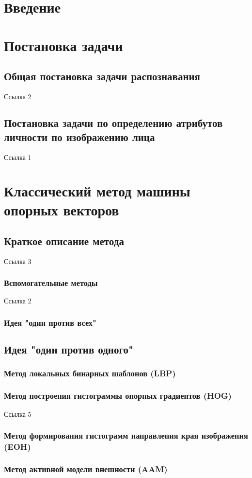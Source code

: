\documentclass[12pt,a4paper]{article}
\begin{document}
\section{Введение}
\section{Постановка задачи}
\subsection{Общая постановка задачи распознавания}
Ссылка 2
\subsection{Постановка задачи по определению атрибутов личности по изображению лица}
Ссылка 1
\section{Классический метод машины опорных векторов}
\subsection{Краткое описание метода}
Ссылка 3
\subsubsection{Вспомогательные методы}
Ссылка 2
\subsubsection{Идея "один против всех"}
\subsection{Идея "один против одного"}
\subsubsection{Метод локальных бинарных шаблонов (LBP)}
\subsubsection{Метод построения гистограммы опорных градиентов (HOG)}
Ссылка 5
\subsubsection{Метод формирования гистограмм направления края
изображения (EOH)}
\subsubsection{Метод активной модели внешности (AAM)}
\end{document}
